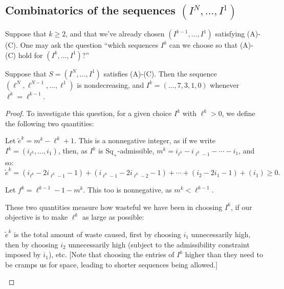 \documentclass[10pt]{article}
\newcommand{\SqShift}{\Sq_{+}}
\newcommand{\Sq}{\mathrm{Sq}}
\newcommand{\minDim}{m}
\begin{document}
\begin{KoszulSequenceCombinatorics}
\subsection{Combinatorics of  the sequences $(I^N,\ldots,I^1)$}
\begin{Omitted}
Suppose that $k\geq2$, and that we've already chosen $(I^{k-1},\ldots,I^1)$ satisfying \textup{(A)}-\textup{(C)}. One may ask the question ``which sequences $I^k$ can we choose so that \textup{(A)}-\textup{(C)} hold for $(I^{k},\ldots,I^1)$?''
\begin{prop}
Suppose that $S=(I^N,\ldots,I^1)$ satisfies \textup{(A)}-\textup{(C)}. Then the sequence $(\ell^N,\ell^{N-1},\ldots,\ell^1)$ is nondecreasing, and $I^k=(\ldots,7,3,1,0)$ whenever $\ell^k=\ell^{k-1}$.%
\end{prop}
\begin{proof}
To investigate this question, for a given choice $I^k$ with $\ell^{k}>0$, we define the following two quantities:
\begin{itemise}
\setlength{\parindent}{.25in}
\item Let $\widetilde{e}^k=\minDim^k-\ell^{k}+1$. This is a nonnegative integer, as if we write $I^k=(i_{\ell^k},\ldots,i_1)$, then, as $I^k$ is $\SqShift$-admissible, $\minDim^k=i_{\ell^k}-i_{\ell^k-1}-\cdots -i_1$, and so:
\[\widetilde{e}^k=(i_{\ell^k}-2i_{\ell^k-1}-1)+ (i_{\ell^k-1}-2i_{\ell^k-2}-1)+\cdots + (i_{2}-2i_{1}-1)+(i_1)\geq0.\]
\item Let $f^k=\ell^{k-1}-1-\minDim^k$. This too is nonnegative, as $\minDim^k<\ell^{k-1}$.
\end{itemise}
These two quantities measure how wasteful we have been in choosing $I^k$, if our objective is to make $\ell^k$ as large as possible:
\begin{itemise}
\setlength{\parindent}{.25in}
\item $\widetilde{e}^k$ is the total amount of waste caused, first by choosing $i_1$ unnecessarily high, then by choosing $i_2$ unnecessarily high (subject to the admissibility constraint imposed by $i_1$), etc. [Note that choosing the entries of $I^k$ higher than they need to be cramps us for space, leading to shorter sequences being allowed.]

\end{itemise}
\end{proof}
\end{Omitted}
\end{KoszulSequenceCombinatorics}
\end{document}
